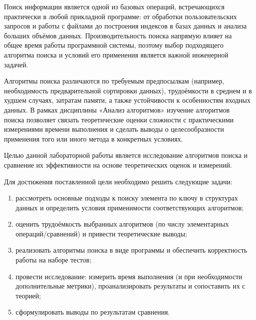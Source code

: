 

Поиск информации является одной из базовых операций, встречающихся практически в любой прикладной программе: от обработки пользовательских запросов и работы с файлами до построения индексов в базах данных и анализа больших объёмов данных. Производительность поиска напрямую влияет на общее время работы программной системы, поэтому выбор подходящего алгоритма поиска и условий его применения является важной инженерной задачей.

Алгоритмы поиска различаются по требуемым предпосылкам (например, необходимость предварительной сортировки данных), трудоёмкости в среднем и в худшем случаях, затратам памяти, а также устойчивости к особенностям входных данных. В рамках дисциплины «Анализ алгоритмов» изучение алгоритмов поиска позволяет связать теоретические оценки сложности с практическими измерениями времени выполнения и сделать выводы о целесообразности применения того или иного метода в конкретных условиях.

Целью данной лабораторной работы является исследование алгоритмов поиска и сравнение их эффективности на основе теоретических оценок и измерений.

Для достижения поставленной цели необходимо решить следующие задачи:
\begin{enumerate}
	\item рассмотреть основные подходы к поиску элемента по ключу в структурах данных и определить условия применимости соответствующих алгоритмов;
	\item оценить трудоёмкость выбранных алгоритмов (по числу элементарных операций/сравнений) и привести теоретические выводы;
	\item реализовать алгоритмы поиска в виде программы и обеспечить корректность работы на наборе тестов;
	\item провести исследование: измерить время выполнения (и при необходимости дополнительные метрики), проанализировать результаты и сопоставить их с теорией;
	\item сформулировать выводы по результатам сравнения.
\end{enumerate}

